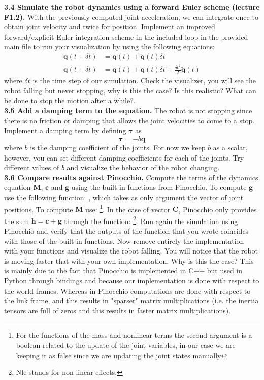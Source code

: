 \documentclass[11pt]{article}
\begin{document}
\textbf{3.4 Simulate the robot dynamics using a forward Euler scheme (lecture F1.2).} 
With the previously computed joint acceleration, we can integrate once to obtain joint velocity and twice for position. 
Implement an improved forward/explicit Euler integration scheme in the included  loop in the provided main file to run your visualization  by using the following equations:
\begin{align*}
	\dot{\mathbf{q}}(t  + \delta t) &= \dot{\mathbf{q}} (t) + \ddot{\mathbf{q}}(t) \delta t \\
	\mathbf{q}(t +\delta t) &= \mathbf{q}(t) + \dot{\mathbf{q}} (t) \delta t + \frac{\delta t^2}{2}\ddot{\mathbf{q}}(t)
\end{align*}
 where $\delta t$ is the time step of our simulation. Check the visualizer, you will see the robot falling 
 but never stopping, why is this the case? Is this realistic? What can be done to stop the motion after a while?. \\ 
 
\textbf{3.5 Add a damping term to the equation.} 
The robot is not stopping since there is no friction or damping that allows the joint velocities to come to a stop. 
Implement a damping term by defining $\mathbf{\tau}$ as
\begin{equation*}
	\boldsymbol{\tau} = -b\dot{\mathbf{q}}
\end{equation*} 
where $b$ is the damping coefficient of the joints. For now we keep $b$ as a scalar, however, you can set different damping coefficients for each of the joints. Try different values of $b$ and visualize the behavior of the robot changing.\\


\textbf{3.6 Compare results against Pinocchio.} Compute the terms of the dynamics equation $\mathbf{M}$, $\mathbf{c}$ and $\mathbf{g}$ using the built in functions from Pinocchio. To compute $\mathbf{g}$ use the following function: , which takes as only argument the vector of joint positions. To compute $\mathbf{M}$ use: \footnote{For the functions of the mass and nonlinear terms the second argument is a boolean related to the update of the joint variables, in our case we are keeping it as false since we are updating the joint states manually}. In the case of vector $\mathbf{C}$, Pinocchio only provides the sum $\mathbf{h} = \mathbf{c} +  \mathbf{g}$ through the function: \footnote{Nle stands for non linear effects.}. Run again the simulation using Pinocchio and verify that the outputs of the function that you wrote coincides with those of the built-in functions. Now remove entirely the implementation with your functions and visualize the robot falling. You will notice that the robot is moving  faster that with your own implementation. Why is this the case?  This is mainly due to the fact that Pinocchio is implemented in C++ but used in Python through bindings and because our implementation is done with respect to the world frames. Whereas in Pinocchio computations are done  with respect to the link frame, and this results in "sparser" matrix multiplications (i.e. the inertia tensors are full of zeros and this results in faster matrix multiplications).
\end{document}
